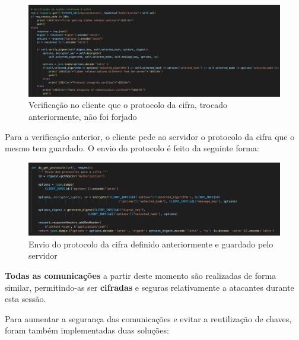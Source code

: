 \documentclass[10pt,english]{article}
\begin{document}
\begin{figure}[!h]
        \centering
        \includegraphics[width=\textwidth]{images/verify_cipher_suite.png}
        \caption{Verificação no cliente que o protocolo da cifra, trocado anteriormente, não foi forjado}
\end{figure}

\par Para a verificação anterior, o cliente pede ao servidor o protocolo da cifra que o mesmo tem guardado. O envio do protocolo é feito da seguinte forma:

\begin{figure}[!h]
        \centering
        \includegraphics[width=\textwidth]{images/get_cipher_suite.png}
        \caption{Envio do protocolo da cifra definido anteriormente e guardado pelo servidor}
\end{figure}

\par \textbf{Todas as comunicações} a partir deste momento são realizadas de forma similar, permitindo-as ser \textbf{cifradas} e seguras relativamente a atacantes durante esta sessão. 

\clearpage

\par Para aumentar a segurança das comunicações e evitar a reutilização de chaves, foram também implementadas duas soluções:
\end{document}
